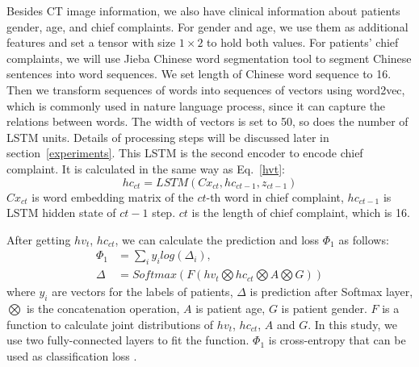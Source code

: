 \documentclass[journal]{IEEEtran}
\begin{document}
Besides CT image information, we also have clinical information about patients gender, age, and chief complaints. For gender and age, we use them as additional features and set a tensor with size $1 \times 2$ to hold both values. For patients' chief complaints, we will use Jieba Chinese word segmentation tool to segment Chinese sentences into word sequences. We set length of Chinese word sequence to 16. Then we transform sequences of words into sequences of vectors using word2vec, which is commonly used in nature language process, since it can capture the relations between words. The width of vectors is set to 50, so does the number of LSTM units. Details of processing steps will be discussed later in section~\ref{experiments}. This LSTM is the second encoder to encode chief complaint. It is calculated in the same way as Eq.~\ref{hvt}:
\begin{equation}
    hc_{ct} = LSTM(Cx_{ct}, hc_{ct-1}, z_{ct-1})
    \label{hct}
\end{equation}
$Cx_{ct}$ is word embedding matrix of the $ct$-th word in chief complaint, $hc_{ct-1}$ is LSTM hidden state of $ct-1$ step. $ct$ is the length of chief complaint, which is 16. 

After getting $hv_t$, $hc_{ct}$, we can calculate the prediction and loss $\Phi_1$ as follows:
\begin{align*}\label{classifyandloss1}
    \Phi_1 &= \sum_i{y_i log(\Delta_i)}, \\
    \Delta &= Softmax(F(hv_t \bigotimes hc_{ct} \bigotimes A \bigotimes G))
\end{align*}
where $y_i$ are vectors for the labels of patients, $\Delta$ is prediction after Softmax layer, $\bigotimes$ is the concatenation operation, $A$ is patient age, $G$ is patient gender. $F$ is a function to calculate joint distributions of $hv_t$, $hc_{ct}$, $A$ and $G$. In this study, we use two fully-connected layers to fit the function. $\Phi_1$ is cross-entropy that can be used as classification loss \cite{Zreik2018A}.
\end{document}
